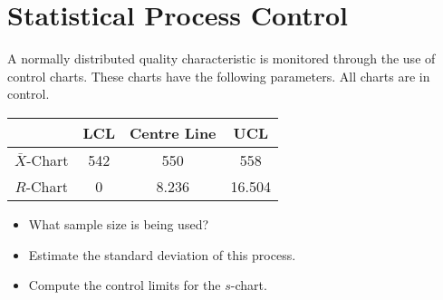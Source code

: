 
\section{Statistical Process Control}
A normally distributed quality characteristic is monitored through the use of control charts. These charts have the 
following parameters. All charts are in control.
\begin{tabular}{|c|c|c|c|}
\hline  & LCL & Centre Line & UCL \\ 
\hline $\bar{X}$-Chart & 542 & 550 & 558 \\ 
\hline $R$-Chart & 0 & 8.236 & 16.504 \\ 
\hline 
\end{tabular} 
\begin{itemize}
\item What sample size is being used?
\item Estimate the standard deviation of this process.
\item Compute the control limits for the $s$-chart.
\end{itemize}

